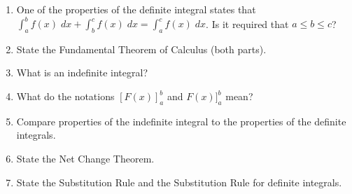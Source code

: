 \documentclass[../main.tex]{subfiles}
\begin{document}
\begin{enumerate}[label=\thesection.\arabic*, align=left]
  \item One of the properties of the definite integral states that \(\int_{a}^{b} f(x) \;dx + \int_{b}^{c} f(x) \;dx = \int_{a}^{c} f(x) \;dx\). Is it required that \(a \le b \le c\)? 

  \item State the Fundamental Theorem of Calculus (both parts). 
      
  \item What is an indefinite integral? 

  \item What do the notations \([F(x)]_{a}^{b}\) and \(F(x)]_{a}^{b}\) mean?

  \item Compare properties of the indefinite integral to the properties of the definite integrals. 

  \item State the Net Change Theorem.

  \item State the Substitution Rule and the Substitution Rule for definite integrals.
\end{enumerate}
\end{document}
